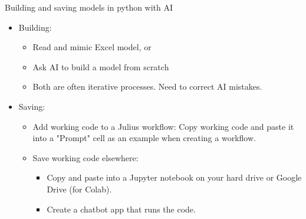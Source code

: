\documentclass[10pt]{beamer}
\begin{document}
\begin{frame}{Building and saving models in python with AI}
\begin{itemize}
\item Building:
\begin{itemize}
\item Read and mimic Excel model, or
\item Ask AI to build a model from scratch
\item Both are often iterative processes.  Need to correct AI mistakes.
\end{itemize}
\item Saving:
\begin{itemize}
\item Add working code to a Julius workflow: Copy working code and paste it into a "Prompt" cell as an example when creating a workflow.  
\item Save working code elsewhere:
\begin{itemize}
\item Copy and paste into a Jupyter notebook on your hard drive or Google Drive (for Colab).
\item Create a chatbot app that runs the code.
\end{itemize}
\end{itemize}
\end{itemize}
\end{frame}
\end{document}
